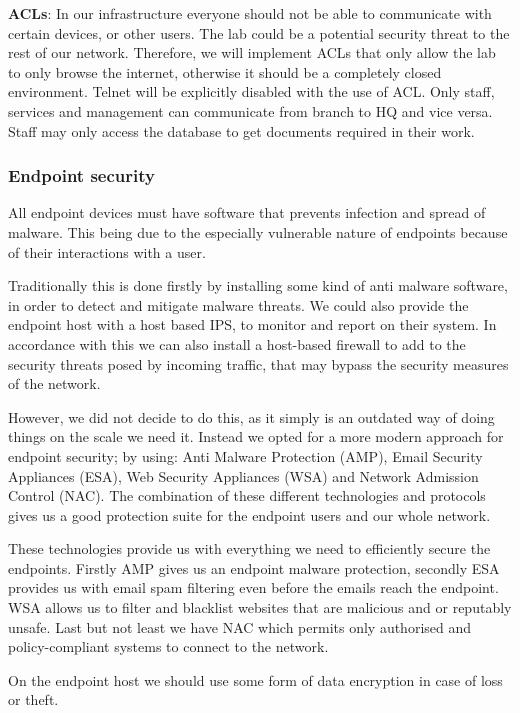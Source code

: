\textbf{ACLs}: In our infrastructure everyone should not be able to communicate with certain devices, or other users. The lab could be a potential security threat to the rest of our network. Therefore, we will implement ACLs that only allow the lab to only browse the internet, otherwise it should be a completely closed environment. Telnet will be explicitly disabled with the use of ACL. Only staff, services and management can communicate from branch to HQ and vice versa. Staff may only access the database to get documents required in their work.

\subsubsection{Endpoint security}

All endpoint devices must have software that prevents infection and spread of malware. This being due to the especially vulnerable nature of endpoints because of their interactions with a user.

Traditionally this is done firstly by installing some kind of anti malware software, in order to detect and mitigate malware threats. We could also provide the endpoint host with a host based IPS, to monitor and report on their system.
In accordance with this we can also install a host-based firewall to add to the security threats posed by incoming traffic, that may bypass the security measures of the network.

However, we did not decide to do this, as it simply is an outdated way of doing things on the scale we need it. Instead we opted for a more modern approach for endpoint security; by using:
Anti Malware Protection (AMP),
Email Security Appliances (ESA),
Web Security Appliances (WSA) 
and Network Admission Control (NAC). 
The combination of these different technologies and protocols gives us a good protection suite for the endpoint users and our whole network.

These technologies provide us with everything we need to efficiently secure the endpoints. Firstly AMP gives us an endpoint malware protection, secondly ESA provides us with email spam filtering even before the emails reach the endpoint.
WSA allows us to filter and blacklist websites that are malicious and or reputably unsafe. Last but not least we have NAC which permits only authorised and policy-compliant systems to connect to the network.

On the endpoint host we should use some form of data encryption in case of loss or theft. 

